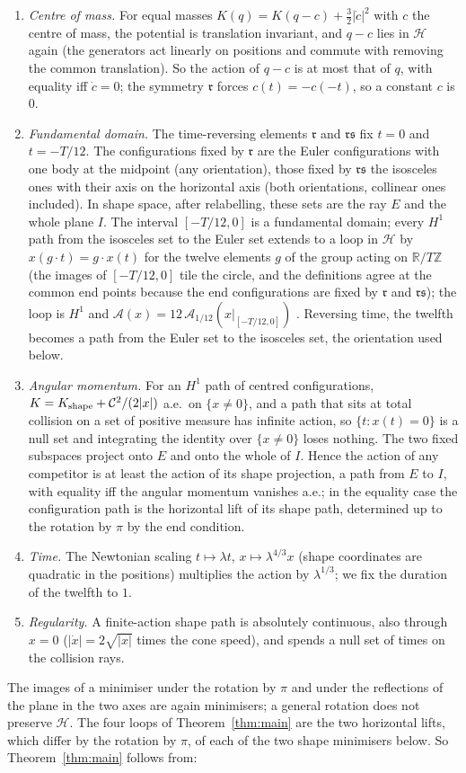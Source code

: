 \documentclass[11pt]{article}
\theoremstyle{definition}
\begin{document}
\begin{enumerate}
\item \emph{Centre of mass.} For equal masses $K(q)=K(q-c)+\tfrac32|\dot c|^2$ with $c$ the centre of mass, the
potential is translation invariant, and $q-c$ lies in $\mathcal H$ again (the generators act linearly on positions and
commute with removing the common translation). So the action of $q-c$ is at most that of $q$, with equality iff
$\dot c=0$; the symmetry $\mathfrak r$ forces $c(t)=-c(-t)$, so a constant $c$ is $0$.
\item \emph{Fundamental domain.} The time-reversing elements $\mathfrak r$ and $\mathfrak r\mathfrak s$ fix $t=0$ and
$t=-T/12$. The configurations fixed by $\mathfrak r$ are the Euler configurations with one body at the midpoint (any
orientation), those fixed by $\mathfrak r\mathfrak s$ the isosceles ones with their axis on the horizontal axis (both
orientations, collinear ones included). In shape space, after relabelling, these sets are the ray $E$ and the whole
plane $I$. The interval $[-T/12,0]$ is a fundamental domain; every $H^1$ path from the isosceles set to the Euler set
extends to a loop in $\mathcal H$ by $x(g\cdot t)=g\cdot x(t)$ for the twelve elements $g$ of the group acting on
$\mathbb R/T\mathbb Z$ (the images of $[-T/12,0]$ tile the circle, and the definitions agree at the common end points
because the end configurations are fixed by $\mathfrak r$ and $\mathfrak r\mathfrak s$); the loop is $H^1$ and
$\mathcal A(x)=12\,\mathcal A_{1/12}(x|_{[-T/12,0]})$ \cite{CM,FM}. Reversing time, the twelfth becomes a path from the Euler set to the isosceles set, the orientation used
below.
\item \emph{Angular momentum.} For an $H^1$ path of centred configurations, $K=K_{\rm shape}+\mathcal C^2/(2|x|)$ a.e.\ on
$\{x\neq0\}$, and a path that sits at total collision on a set of positive measure has infinite action, so
$\{t:x(t)=0\}$ is a null set and integrating the identity over $\{x\ne0\}$ loses nothing. The two fixed
subspaces project onto $E$ and onto the whole of $I$. Hence the action of any competitor is at least the action of its
shape projection, a path from $E$ to $I$, with equality iff the angular momentum vanishes a.e.; in the equality case
the configuration path is the horizontal lift of its shape path, determined up to the rotation by $\pi$ by the end
condition.
\item \emph{Time.} The Newtonian scaling $t\mapsto\lambda t$, $x\mapsto\lambda^{4/3}x$ (shape coordinates are quadratic
in the positions) multiplies the action by $\lambda^{1/3}$; we fix the duration of the twelfth to $1$.
\item \emph{Regularity.} A finite-action shape path is absolutely continuous, also through $x=0$
($|\dot x|=2\sqrt{|x|}$ times the cone speed), and spends a null set of times on the collision rays.
\end{enumerate}
The images of a minimiser under the rotation by $\pi$ and under the reflections of the plane in the two axes are again
minimisers; a general rotation does not preserve $\mathcal H$. The four loops of Theorem~\ref{thm:main} are the two
horizontal lifts, which differ by the rotation by $\pi$, of each of the two shape minimisers below. So
Theorem~\ref{thm:main} follows from:
\end{document}
